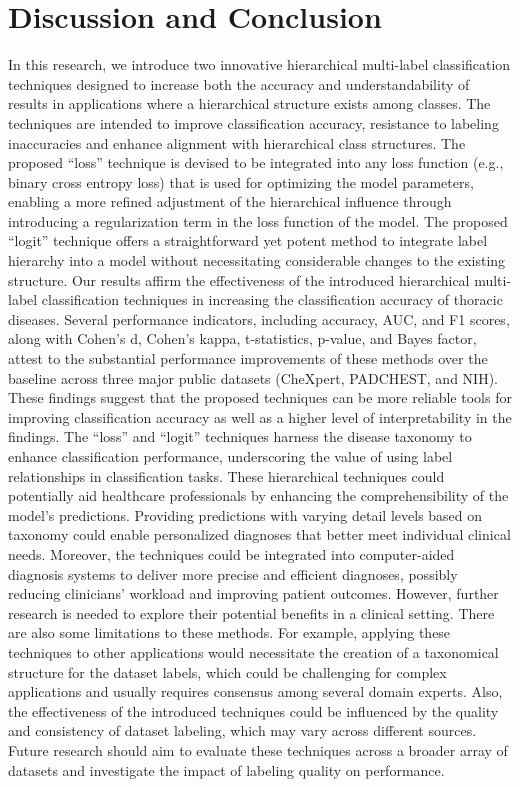 \documentclass[authoryear,preprint,review,12pt]{elsarticle}
\begin{document}
\section{Discussion and Conclusion}\label{sec:taxonomy.discussion}
%
In this research, we introduce two innovative hierarchical multi-label classification techniques designed to increase both the accuracy and understandability of results in applications where a hierarchical structure exists among classes. The techniques are intended to improve classification accuracy, resistance to labeling inaccuracies and enhance alignment with hierarchical class structures. The proposed ``loss'' technique is devised to be integrated into any loss function (e.g., binary cross entropy loss) that is used for optimizing the model parameters, enabling a more refined adjustment of the hierarchical influence through introducing a regularization term in the loss function of the model. The proposed ``logit'' technique offers a straightforward yet potent method to integrate label hierarchy into a model without necessitating considerable changes to the existing structure.
%
Our results affirm the effectiveness of the introduced hierarchical multi-label classification techniques in increasing the classification accuracy of thoracic diseases. Several performance indicators, including accuracy, AUC, and F1 scores, along with Cohen's d, Cohen's kappa, t-statistics, p-value, and Bayes factor, attest to the substantial performance improvements of these methods over the baseline across three major public datasets (CheXpert, PADCHEST, and NIH). These findings suggest that the proposed techniques can be more reliable tools for improving classification accuracy as well as a higher level of interpretability in the findings.
%
The ``loss'' and ``logit'' techniques harness the disease taxonomy to enhance classification performance, underscoring the value of using label relationships in classification tasks. These hierarchical techniques could potentially aid healthcare professionals by enhancing the comprehensibility of the model's predictions. Providing predictions with varying detail levels based on taxonomy could enable personalized diagnoses that better meet individual clinical needs. Moreover, the techniques could be integrated into computer-aided diagnosis systems to deliver more precise and efficient diagnoses, possibly reducing clinicians' workload and improving patient outcomes.
%
However, further research is needed to explore their potential benefits in a clinical setting. There are also some limitations to these methods. For example, applying these techniques to other applications would necessitate the creation of a taxonomical structure for the dataset labels, which could be challenging for complex applications and usually requires consensus among several domain experts. Also, the effectiveness of the introduced techniques could be influenced by the quality and consistency of dataset labeling, which may vary across different sources. Future research should aim to evaluate these techniques across a broader array of datasets and investigate the impact of labeling quality on performance.
\end{document}
